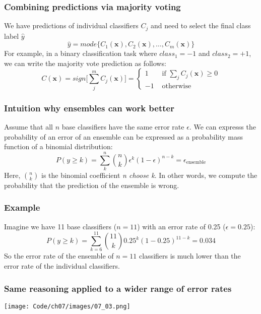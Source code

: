 \documentclass{beamer}
\begin{document}
\begin{frame}
  \frametitle{Combining predictions via majority voting}
  We have predictions of individual classifiers $C_j$ and need to select the final class label $\hat{y}$
  \[
  \hat{y} = mode \{ C_1 (\mathbf{x}), C_2 (\mathbf{x}), \dots, C_m (\mathbf{x}) \}
  \]
  For example, in a binary classification task where $class_1 = -1$ and $class_2 = +1$, we can write the majority vote prediction as follows:
  \[
  C(\mathbf{x}) = sign \Bigg[ \sum_{j}^{m} C_j (\mathbf{x}) \Bigg] = \begin{cases}
        1 & \text{ if } \sum_j C_j (\mathbf{x}) \ge 0 \\
        -1 & \text{ otherwise }
     \end{cases}
  \]
\end{frame}

\begin{frame}
  \frametitle{Intuition why ensembles can work better}
  Assume that all $n$ base classifiers have the same error rate $\epsilon$. We can expresss the probability of an error of an ensemble can be expressed as a probability mass function of a binomial distribution:
  \[
  P(y \ge k) = \sum_{k}^{n} \binom{n}{k} \epsilon^k (1 - \epsilon)^{n-k} = \epsilon_{\text{ensemble}}
  \]
  Here, $\binom{n}{k}$ is the binomial coefficient \textit{n choose k}. In other words, we compute the probability that the prediction of the ensemble is wrong.
\end{frame}

\begin{frame}
  \frametitle{Example}
  Imagine we have 11 base classifiers ($n=11$) with an error rate of 0.25 ($\epsilon = 0.25$):
  \[
  P(y \ge k) = \sum_{k=6}^{11} \binom{11}{k} 0.25^k (1 - 0.25)^{11-k} = 0.034
  \]
  So the error rate of the ensemble of $n=11$ classifiers is much lower than the error rate of the individual classifiers.
\end{frame}

\begin{frame}
  \frametitle{Same reasoning applied to a wider range of error rates}
  \center
  \texttt{[image: Code/ch07/images/07\_03.png]}
\end{frame}
\end{document}
